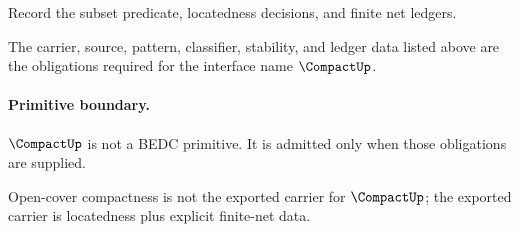 \begin{definition}
\label{def:compact-ledger-policy}
Record the subset predicate, locatedness decisions, and finite net ledgers.
\end{definition}

\begin{definition}
\label{def:compact-certificate-obligations}
The carrier, source, pattern, classifier, stability, and ledger data listed above are the obligations required for the interface name \(\CompactUp\).
\end{definition}

\paragraph{Primitive boundary.}
$\CompactUp$ is not a BEDC primitive. It is admitted only when those obligations are supplied.

\begin{remark}
\label{rem:compact-zero-axiom-note}
Open-cover compactness is not the exported carrier for $\CompactUp$; the exported carrier is locatedness plus explicit finite-net data.
\end{remark}
